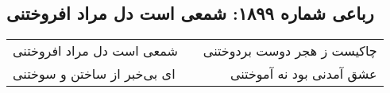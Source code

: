 \begin{center}
\section*{رباعی شماره ۱۸۹۹: شمعی است دل مراد افروختنی}
\label{sec:1899}
\begin{longtable}{l p{0.5cm} r}
شمعی است دل مراد افروختنی
&&
چاکیست ز هجر دوست بردوختنی
\\
ای بی‌خبر از ساختن و سوختنی
&&
عشق آمدنی بود نه آموختنی
\\
\end{longtable}
\end{center}
